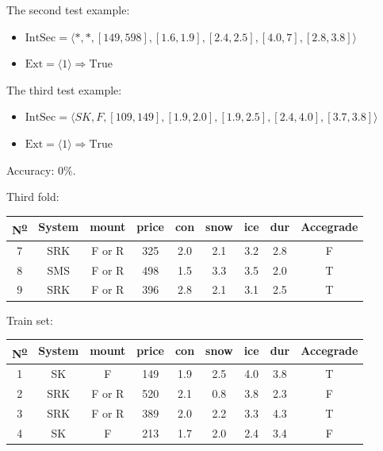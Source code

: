 \documentclass[12pt]{report}
\begin{document}
\begin{solution}
\begin{enumerate}
\begin{itemize}
      \end{itemize}
      The second test example:
      \begin{itemize}
        \item $\text{IntSec} = \langle *, *, [ 149, 598], [1.6, 1.9], [2.4, 2.5], [4.0, 7], [2.8, 3.8] \rangle$
        \item $\text{Ext} = \langle 1 \rangle \Longrightarrow \text{True}$
      \end{itemize}
      The third test example:
      \begin{itemize}
        \item $\text{IntSec} = \langle SK, F, [ 109, 149], [1.9, 2.0], [1.9, 2.5], [2.4, 4.0], [3.7, 3.8] \rangle$
        \item $\text{Ext} = \langle 1 \rangle \Longrightarrow \text{True}$
      \end{itemize}
      Accuracy: $0\%$.
      \par 
      Third fold:
      \begin{table}[H]
        \centering
        \begin{tabular}{|c|c|c|c|c|c|c|c|c|}
        \hline
        N\textsuperscript{\underline{o}} & System & mount  & price & con & snow & ice & dur & Accegrade \\ \hline
        7 & SRK    & F or R & 325   & 2.0 & 2.1  & 3.2 & 2.8 & F         \\ \hline
        8 & SMS    & F or R & 498   & 1.5 & 3.3  & 3.5 & 2.0 & T         \\ \hline
        9 & SRK    & F or R & 396   & 2.8 & 2.1  & 3.1 & 2.5 & T         \\ \hline
        \end{tabular}
        \end{table}
        Train set:
        \begin{table}[H]
          \centering
          \begin{tabular}{|c|c|c|c|c|c|c|c|c|}
          \hline
          N\textsuperscript{\underline{o}}  & System & mount  & price & con & snow & ice & dur & Accegrade \\ \hline
          1  & SK     & F      & 149   & 1.9 & 2.5  & 4.0 & 3.8 & T         \\ \hline
          2  & SRK    & F or R & 520   & 2.1 & 0.8  & 3.8 & 2.3 & F         \\ \hline
          3  & SRK    & F or R & 389   & 2.0 & 2.2  & 3.3 & 4.3 & T         \\ \hline
          4  & SK     & F      & 213   & 1.7 & 2.0  & 2.4 & 3.4 & F         \\ \hline

\end{tabular}
\end{table}
\end{enumerate}
\end{solution}
\end{document}
